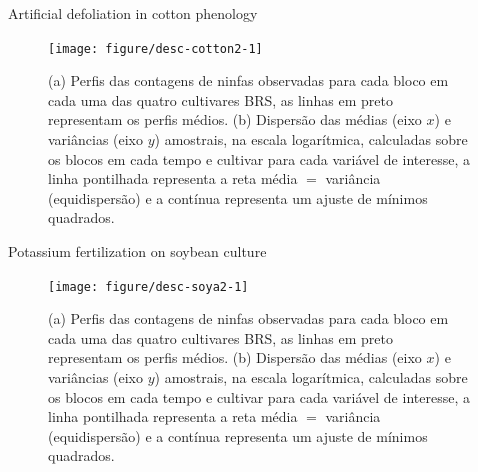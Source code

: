 \documentclass[11pt]{beamer}\usepackage[]{graphicx}\usepackage[]{color}
\newenvironment{knitrout}{}{} %
\begin{document}
\begin{frame}{Artificial defoliation in cotton phenology}
\vspace{-0.2cm}
\begin{knitrout}
\color{fgcolor}\begin{figure}[!htb]

{\centering \texttt{[image: figure/desc-cotton2-1]} 

}

\caption[(a) Perfis das contagens de ninfas observadas para cada bloco em cada uma das quatro cultivares BRS, as linhas em preto representam os perfis médios]{(a) Perfis das contagens de ninfas observadas para cada bloco em cada uma das quatro cultivares BRS, as linhas em preto representam os perfis médios. (b) Dispersão das médias (eixo $x$) e variâncias (eixo $y$) amostrais, na escala logarítmica, calculadas sobre os blocos em cada tempo e cultivar para cada variável de interesse, a linha pontilhada representa a reta média $=$ variância (equidispersão) e a contínua representa um ajuste de mínimos quadrados.}\label{fig:desc-cotton2}
\end{figure}


\end{knitrout}

\end{frame}

\begin{frame}{Potassium fertilization on soybean culture}
\vspace{-0.3cm}
\begin{knitrout}
\color{fgcolor}\begin{figure}[!htb]

{\centering \texttt{[image: figure/desc-soya2-1]} 

}

\caption[(a) Perfis das contagens de ninfas observadas para cada bloco em cada uma das quatro cultivares BRS, as linhas em preto representam os perfis médios]{(a) Perfis das contagens de ninfas observadas para cada bloco em cada uma das quatro cultivares BRS, as linhas em preto representam os perfis médios. (b) Dispersão das médias (eixo $x$) e variâncias (eixo $y$) amostrais, na escala logarítmica, calculadas sobre os blocos em cada tempo e cultivar para cada variável de interesse, a linha pontilhada representa a reta média $=$ variância (equidispersão) e a contínua representa um ajuste de mínimos quadrados.}\label{fig:desc-soya2}
\end{figure}


\end{knitrout}

\end{frame}
\end{document}
